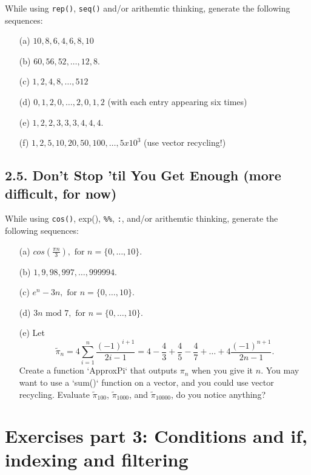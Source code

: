 \documentclass[]{article}
\begin{document}
While using \texttt{rep()}, \texttt{seq()} and/or arithemtic thinking,
generate the following sequences:

\begin{itemize}
\item[(a)] $10, 8, 6, 4, 6, 8, 10$
\item[(b)] $60, 56, 52, \ldots, 12, 8$.
\item[(c)] $1, 2, 4, 8, \ldots, 512$
\item[(d)] $0, 1, 2, 0, \ldots, 2, 0, 1, 2$ (with each entry appearing six times)
\item[(e)] $1, 2, 2, 3, 3, 3, 4, 4, 4$.
\item[(f)] $1, 2, 5, 10, 20, 50, 100, \ldots, 5 x 10^3$ (use vector recycling!)
\end{itemize}

\hypertarget{dont-stop-til-you-get-enough-more-difficult-for-now}{%
\subsection{2.5. Don't Stop 'til You Get Enough (more difficult, for
now)}\label{dont-stop-til-you-get-enough-more-difficult-for-now}}

While using \texttt{cos()}, exp(), \texttt{\%\%}, \texttt{:}, and/or
arithemtic thinking, generate the following sequences:

\begin{itemize}
\item[(a)] $cos\left( \frac{\pi n}{3}\right), \text{ for } n = \{0, \ldots, 10\}.$
\item[(b)] $1, 9, 98,997, \ldots, 999994.$
\item[(c)] $e^n - 3n, \text{ for } n = \{0, \ldots, 10\}.$
\item[(d)] $3n \mbox{ mod } 7, \text{ for } n = \{0, \ldots, 10\}.$
\item[(e)] Let
$$ \tilde{\pi}_n = 4 \sum^n_{i = 1} \frac{(-1)^{i + 1}}{2i - 1} = 4 - \frac{4}{3} + \frac{4}{5} - \frac{4}{7} + \ldots + 4\frac{(-1)^{n + 1}}{2n - 1}.$$ Create a function `ApproxPi` that outputs $\pi_n$ when you give it $n$. You may want to use a `sum()` function on a vector, and you could use vector recycling. Evaluate $\tilde{\pi}_{100}$, $\tilde{\pi}_{1000}$, and $\tilde{\pi}_{10000}$, do you notice anything?
\end{itemize}

\newpage

\hypertarget{exercises-part-3-conditions-and-if-indexing-and-filtering}{%
\section{Exercises part 3: Conditions and if, indexing and
filtering}\label{exercises-part-3-conditions-and-if-indexing-and-filtering}}
\end{document}
